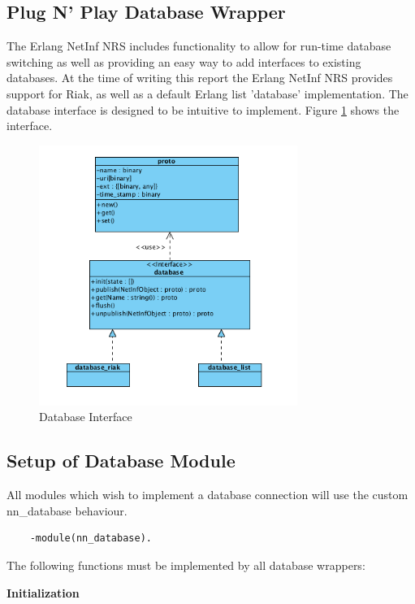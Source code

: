 \subsection {Plug N' Play Database Wrapper}
\label{PNP}
The Erlang NetInf NRS includes functionality to allow for run-time database switching as well as providing an easy way to add interfaces to existing databases. At the time of writing this report the Erlang NetInf NRS provides support for Riak, as well as a default Erlang list 'database' implementation. The database interface is designed to be intuitive to implement. Figure \ref{fig:dbfig} shows the interface.

\begin{figure}[H]
	\centering
\centerline{\includegraphics[width=0.75\textwidth]{./img/database_api.png}}
\caption{Database Interface}
\label{fig:dbfig}
\end{figure}

\subsection {Setup of Database Module}

All modules which wish to implement a database connection will use the custom nn\_database behaviour.

\begin {verbatim}
    -module(nn_database).
\end{verbatim}

The following functions must be implemented by all database wrappers:

\textbf{Initialization}


